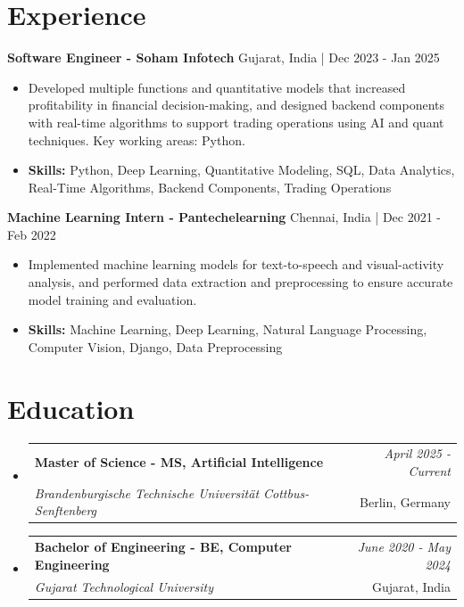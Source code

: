 \documentclass[a4paper,11pt]{article}
\makeatletter
\newcommand{\resumeSubheading}[4]{
\vspace{0.5mm}\item
    \begin{tabular*}{\linewidth}[t]{l@{\extracolsep{\fill}}r}
        \textbf{#1} & \textit{\footnotesize{#4}} \\
        \textit{\footnotesize{#3}} &  \footnotesize{#2}\\
    \end{tabular*}
    \vspace{-2.4mm}
}
\makeatother
\begin{document}
\section{\textbf{Experience}}


\vspace{1mm}
  \textbf{Software Engineer - Soham Infotech} \hfill Gujarat, India | Dec 2023 - Jan 2025
\vspace{-1.5mm} %
\begin{itemize}
  \item Developed multiple functions and quantitative models that increased profitability in financial decision-making, and designed backend components with real-time algorithms to support trading operations using AI and quant techniques. Key working areas: Python.

\vspace{-2mm}
  \item \textbf{Skills:} Python, Deep Learning, Quantitative Modeling, SQL, Data Analytics, Real-Time Algorithms, Backend Components, Trading Operations
\end{itemize}

\vspace{1mm}
  \textbf{Machine Learning Intern - Pantechelearning} \hfill Chennai, India | Dec 2021 - Feb 2022
\vspace{-1.5mm} %
\begin{itemize}
  \item Implemented machine learning models for text-to-speech and visual-activity analysis, and performed data extraction and preprocessing to ensure accurate model training and evaluation.
\vspace{-2mm}
  \item \textbf{Skills:} Machine Learning, Deep Learning, Natural Language Processing, Computer Vision, Django, Data Preprocessing
\end{itemize}\section{\textbf{Education}}
\vspace{-0.4mm}

\begin{itemize}[leftmargin=0.15in, label={}]
\resumeSubheading
{Master of Science - MS, Artificial Intelligence }{Berlin, Germany}
{Brandenburgische Technische Universität Cottbus-Senftenberg  }{April 2025 - Current}

\vspace{1.0mm} %
\resumeSubheading
{Bachelor of Engineering - BE, Computer Engineering  }{Gujarat, India}
{Gujarat Technological University }{June 2020 - May 2024}

\end{itemize}
\end{document}
